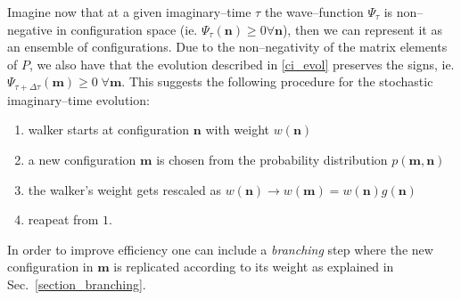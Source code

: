 Imagine now that at a given imaginary--time $\tau$ the wave--function $\Psi_{\tau}$ is non--negative in configuration 
space (ie. $\Psi_{\tau}(\mathbf{n}) \geq 0 \forall\mathbf{n}$), then we can represent it as an ensemble of configurations. Due to the non--negativity of the matrix elements of $P$, we also have
that the evolution described in \eqref{ci_evol} preserves the signs, ie. $\Psi_{\tau+\Delta\tau}(\mathbf{m}) \geq 0 \; \forall \mathbf{m}$. This suggests the following procedure 
for the stochastic imaginary--time evolution: 
\begin{enumerate}
 \item walker starts at configuration $\mathbf{n}$ with weight $w(\mathbf{n})$
 \item a new configuration $\mathbf{m}$ is chosen from the probability distribution $p(\mathbf{m},\mathbf{n})$
 \item the walker's weight gets rescaled as $w(\mathbf{n}) \to w(\mathbf{m})=w(\mathbf{n})g(\mathbf{n})$
 \item reapeat from $1.$
\end{enumerate}
In order to improve efficiency one can include a {\it branching} step where the new configuration in $\mathbf{m}$
is replicated according to its weight as explained in Sec.~\ref{section_branching}.

